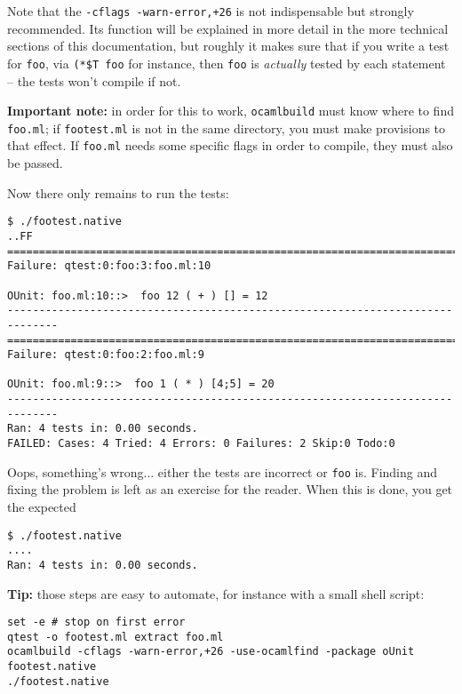 Note that the \texttt{-cflags -warn-error,+26} is not indispensable but strongly recommended. Its
function will be explained in more detail in the more technical sections of this
documentation, but roughly it makes sure that if you write a test for \texttt{foo}, via
\texttt{(*\$T foo} for instance, then \texttt{foo} is \emph{actually} tested by each statement
-- the tests won't compile if not.

\textbf{Important note:} in order for this to work, \texttt{ocamlbuild} must know where to find
\texttt{foo.ml}; if \texttt{footest.ml} is not in the same directory, you must make provisions to that
effect. If \texttt{foo.ml} needs some specific flags in order to compile, they must also be
passed.


Now there only remains to run the tests:

\begin{verbatim}
$ ./footest.native
..FF
==============================================================================
Failure: qtest:0:foo:3:foo.ml:10

OUnit: foo.ml:10::>  foo 12 ( + ) [] = 12
------------------------------------------------------------------------------
==============================================================================
Failure: qtest:0:foo:2:foo.ml:9

OUnit: foo.ml:9::>  foo 1 ( * ) [4;5] = 20
------------------------------------------------------------------------------
Ran: 4 tests in: 0.00 seconds.
FAILED: Cases: 4 Tried: 4 Errors: 0 Failures: 2 Skip:0 Todo:0
\end{verbatim}

Oops, something's wrong... either the tests are incorrect or \texttt{foo} is. Finding and fixing
the problem is left as an exercise for the reader. When this is done, you get the expected

\begin{verbatim}
$ ./footest.native
....
Ran: 4 tests in: 0.00 seconds.
\end{verbatim}

\textbf{Tip:} those steps are easy to automate, for instance with a small shell script:


\begin{verbatim}
set -e # stop on first error
qtest -o footest.ml extract foo.ml
ocamlbuild -cflags -warn-error,+26 -use-ocamlfind -package oUnit footest.native
./footest.native
\end{verbatim}
\Overbatim